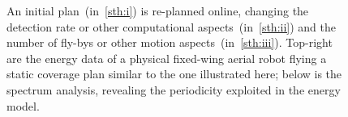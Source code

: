 \documentclass[letterpaper,10pt,journal,twoside]{IEEEtran}
\newcommand{\figpath}{./figures}
\theoremstyle{definition}
\begin{document}
\begin{figure}[t]
  \centering
  \vspace*{-9ex}
        {\color{blue}\scriptsize }
  \caption{%
  An initial plan~(in~\ref{sth:i}) {\color{blue}is} re-planned online, changing the %
  detection rate or other computational aspects~(in~\ref{sth:ii}) and %
  the number of fly-bys or other motion aspects~(in~\ref{sth:iii}). 
  {\color{blue}Top-right} %
  {\color{blue}are} the energy data of a physical fixed-wing aerial robot flying a static coverage plan similar to the one illustrated here{\color{blue}; below is }%
  the spectrum analysis, %
  revealing the periodicity %
  exploited in the %
  energy model.
  }
  \label{fig:il-abs}
  \vspace*{-4ex}
\end{figure}
\end{document}
